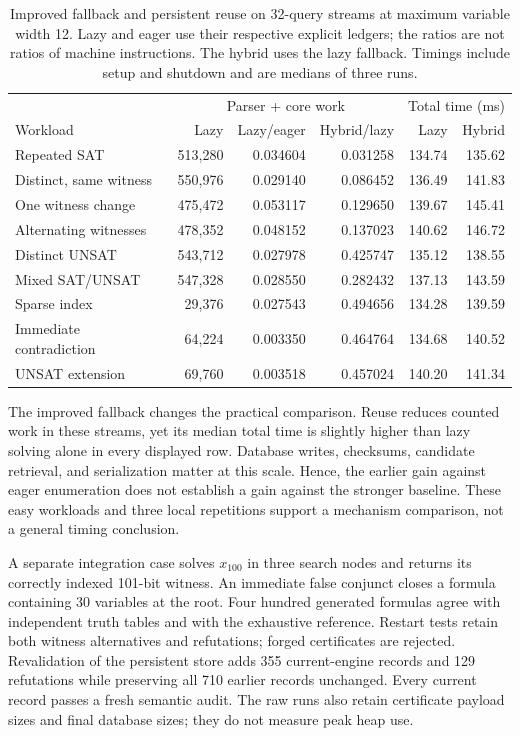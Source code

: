 \documentclass[11pt,a4paper]{article}
\numberwithin{equation}{section}
\theoremstyle{plain}
\theoremstyle{definition}
\theoremstyle{remark}
\begin{document}
\begin{table}[htbp]
\centering
\small
\setlength{\tabcolsep}{4pt}
\begin{tabular}{lrrrrr}
\hline
& \multicolumn{3}{c}{Parser + core work} & \multicolumn{2}{c}{Total time (ms)} \\
Workload & Lazy & Lazy/eager & Hybrid/lazy & Lazy & Hybrid \\
\hline
Repeated SAT & 513,280 & 0.034604 & 0.031258 & 134.74 & 135.62 \\
Distinct, same witness & 550,976 & 0.029140 & 0.086452 & 136.49 & 141.83 \\
One witness change & 475,472 & 0.053117 & 0.129650 & 139.67 & 145.41 \\
Alternating witnesses & 478,352 & 0.048152 & 0.137023 & 140.62 & 146.72 \\
Distinct UNSAT & 543,712 & 0.027978 & 0.425747 & 135.12 & 138.55 \\
Mixed SAT/UNSAT & 547,328 & 0.028550 & 0.282432 & 137.13 & 143.59 \\
Sparse index & 29,376 & 0.027543 & 0.494656 & 134.28 & 139.59 \\
Immediate contradiction & 64,224 & 0.003350 & 0.464764 & 134.68 & 140.52 \\
UNSAT extension & 69,760 & 0.003518 & 0.457024 & 140.20 & 141.34 \\
\hline
\end{tabular}
\caption{Improved fallback and persistent reuse on 32-query streams at maximum variable width 12. Lazy and eager use their respective explicit ledgers; the ratios are not ratios of machine instructions. The hybrid uses the lazy fallback. Timings include setup and shutdown and are medians of three runs.}
\label{tab:lazy-results}
\end{table}

The improved fallback changes the practical comparison. Reuse reduces counted work in these streams, yet its median total time is slightly higher than lazy solving alone in every displayed row. Database writes, checksums, candidate retrieval, and serialization matter at this scale. Hence, the earlier gain against eager enumeration does not establish a gain against the stronger baseline. These easy workloads and three local repetitions support a mechanism comparison, not a general timing conclusion.

A separate integration case solves $x_{100}$ in three search nodes and returns its correctly indexed 101-bit witness. An immediate false conjunct closes a formula containing 30 variables at the root. Four hundred generated formulas agree with independent truth tables and with the exhaustive reference. Restart tests retain both witness alternatives and refutations; forged certificates are rejected. Revalidation of the persistent store adds 355 current-engine records and 129 refutations while preserving all 710 earlier records unchanged. Every current record passes a fresh semantic audit. The raw runs also retain certificate payload sizes and final database sizes; they do not measure peak heap use.
\end{document}
